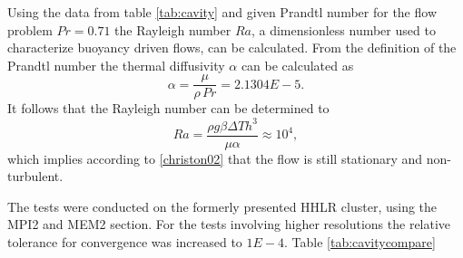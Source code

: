 Using the data from table \ref{tab:cavity} and given Prandtl number for the flow problem \(Pr = 0.71\) the Rayleigh number \(Ra\), a dimensionless number used to characterize buoyancy driven flows, can be calculated. From the definition of the Prandtl number the thermal diffusivity \(\alpha\) can be calculated as
\begin{displaymath}
  \alpha = \frac{\mu}{\rho \, Pr} = 2.1304E-5.
\end{displaymath}
It follows that the Rayleigh number can be determined to 
\begin{displaymath}
  Ra = \frac{\rho g \beta \Delta T h^3}{\mu \alpha} \approx 10^4,
\end{displaymath}
which implies according to \ref{christon02} that the flow is still stationary and non-turbulent.

The tests were conducted on the formerly presented HHLR cluster, using the MPI2 and MEM2 section. For the tests involving higher resolutions the relative tolerance for convergence was increased to $1E-4$. Table \ref{tab:cavitycompare}

